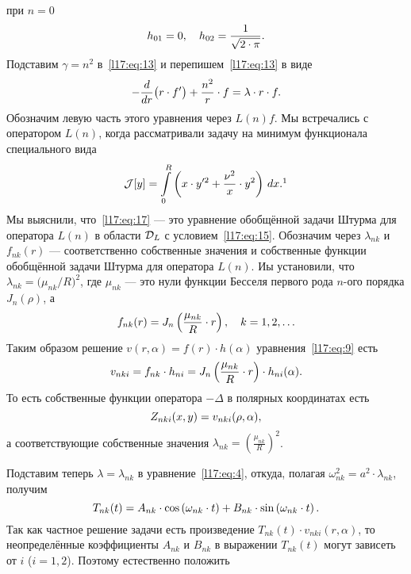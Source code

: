 при $n=0$
\begin{equation*}
	\hfill h_{01}=0,\quad h_{02}=\frac{1}{\sqrt{2\cdot\pi}}.\hfill
\end{equation*}
Подставим $\gamma=n^2$ в~\eqref{l17:eq:13} и перепишем~\eqref{l17:eq:13} в виде
\begin{equation}\label{l17:eq:17}
	\hfill-\der{}{r}\big(r\cdot f'\big)+\frac{n^2}{r}\cdot f=\lambda\cdot r\cdot f.\hfill
\end{equation}
Обозначим левую часть этого уравнения через $L(n)f$. Мы встречались с оператором $L(n)$, когда рассматривали задачу на минимум функционала специального вида 
\begin{equation*}
	\hfill\J[y]=\int\limits_{0}^{R}\left(x\cdot y'^2+\frac{\nu^2}{x}\cdot y^2\right)\,dx.\footnotemark{}\hfill
\end{equation*}%
Мы выяснили, что~\eqref{l17:eq:17} --- это уравнение обобщённой задачи Штурма для оператора $L(n)$ в области $\mathcal{D}_{L}$ с условием~\eqref{l17:eq:15}. Обозначим через $\lambda_{nk}$ и $f_{nk}(r)$ --- соответственно собственные значения и собственные функции обобщённой задачи Штурма для оператора $L(n)$. Иы установили, что $\lambda_{nk}=\big(\mu_{nk}/R\big)^2$, где $\mu_{nk}$ --- это нули функции Бесселя первого рода $n$-ого порядка $J_n(\rho)$, а
\begin{equation*}
	\hfill f_{nk}(r)=J_n\left(\frac{\mu_{nk}}{R}\cdot r\right),\quad k=1,2,\ldots\hfill
\end{equation*}  
Таким образом решение $v(r,\alpha)=f(r)\cdot h(\alpha)$ уравнения~\eqref{l17:eq:9} есть
\begin{equation}\label{l17:eq:18}
	\hfill v_{nki}=f_{nk}\cdot h_{ni}=J_{n}\left(\frac{\mu_{nk}}{R}\cdot r\right)\cdot h_{ni}(\alpha).\hfill
\end{equation}
То есть собственные функции оператора $-\Delta$ в полярных координатах есть
\begin{equation*}
	\hfill Z_{nki}(x,y)=v_{nki}(\rho,\alpha),\hfill
\end{equation*}
а соответствующие собственные значения $\displaystyle\lambda_{nk}=\left(\frac{\mu_{nk}}{R}\right)^2$. 

Подставим теперь $\lambda=\lambda_{nk}$ в уравнение~\eqref{l17:eq:4}, откуда, полагая $\omega_{nk}^2=a^2\cdot\lambda_{nk}$, получим
\begin{equation*}
	\hfill T_{nk}(t)=A_{nk}\cdot\cos\left(\omega_{nk}\cdot t\right)+B_{nk}\cdot\sin\left(\omega_{nk}\cdot t\right).\hfill
\end{equation*}
Так как частное решение задачи есть произведение $T_{nk}(t)\cdot v_{nki}(r,\alpha)$, то неопределённые коэффициенты $A_{nk}$ и $B_{nk}$ в выражении $T_{nk}(t)$ могут зависеть от $i$ ($i=1,2$). Поэтому естественно положить 

